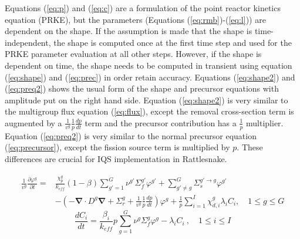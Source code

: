 \documentclass[12pt]{scrartcl}
\renewcommand{\div}{\bs{\nabla}\! \cdot \!}
\newcommand{\grad}{\bs{\nabla}}
\newcommand{\bs}[1]{\mathbf{#1}}
\newcommand{\keff}{k_\textit{eff}}
\newcommand{\be}{\begin{equation}}
\newcommand{\ee}{\end{equation}}
\begin{document}
Equations (\ref{eq:p}) and (\ref{eq:c}) are a formulation of the point reactor kinetics equation (PRKE), but the parameters (Equations (\ref{eq:rmb})-(\ref{eq:l})) are dependent on the shape.  If the assumption is made that the shape is time-independent, the shape is computed once at the first time step and used for the PRKE parameter evaluation at all other steps.  However, if the shape is dependent on time, the shape needs to be computed in transient using equation (\ref{eq:shape}) and (\ref{eq:prec}) in order retain accuracy.  Equations (\ref{eq:shape2}) and (\ref{eq:preq2}) shows the usual form of the shape and precursor equations with amplitude put on the right hand side.  Equation (\ref{eq:shape2}) is very similar to the multigroup flux equation (\ref{eq:flux}), except the removal cross-section term is augmented by a $\frac{1}{v^g}\frac{1}{p}\frac{dp}{dt}$ term and the precursor contribution has a $\frac{1}{p}$ multiplier.  Equation (\ref{eq:preq2}) is very similar to the normal precursor equation (\ref{eq:precursor}), except the fission source term is multiplied by $p$.  These differences are crucial for IQS implementation in Rattlesnake.

\begin{align}
\frac{1}{v^g}\frac{\partial\varphi^g}{\partial t} = &\frac{\chi_p^g}{\keff} (1-\beta)\sum_{g'=1}^G  \nu^{g'} \Sigma_f^{g'} \varphi^{g'} + \sum_{g'\neq g}^G\Sigma_s^{g'\to g} \varphi^{g'} \nonumber \\ 
& -  \left( -\div D^g \grad  + \Sigma_r^g + \frac{1}{v^g}\frac{1}{p}\frac{dp}{dt}\right) \varphi^g + \frac{1}{p}\sum_{i=1}^I\chi_{d,i}^g\lambda_iC_i  , \quad 1 \le g \le G 
\label{eq:shape2}
\end{align}
\be
\frac{dC_i}{dt} = \frac{\beta_i}{\keff}p \sum_{g=1}^G\nu^{g} \Sigma_f^g \varphi^{g} - \lambda_i C_i \ , \quad 1 \le i \le I 
\label{eq:preq2}
\ee

\end{document}
